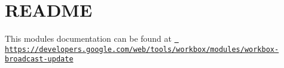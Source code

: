\chapter{README}
\hypertarget{md_pkiclassroomrescheduler_2src_2main_2frontend_2node__modules_2workbox-broadcast-update_2_r_e_a_d_m_e}{}\label{md_pkiclassroomrescheduler_2src_2main_2frontend_2node__modules_2workbox-broadcast-update_2_r_e_a_d_m_e}
This module\textquotesingle{}s documentation can be found at \href{https://developers.google.com/web/tools/workbox/modules/workbox-broadcast-update}{\texttt{ https\+://developers.\+google.\+com/web/tools/workbox/modules/workbox-\/broadcast-\/update}} 